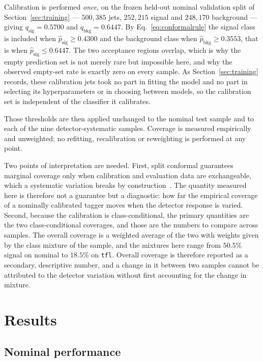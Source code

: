 \documentclass[pdflatex,sn-mathphys,Numbered,iicol]{sn-jnl}
\begin{document}
Calibration is performed \emph{once}, on the frozen held-out nominal validation split
of Section~\ref{sec:training} --- $500{,}385$ jets, $252{,}215$ signal and $248{,}170$
background --- giving $q_{\mathrm{sig}} = 0.5700$ and $q_{\mathrm{bkg}} = 0.6447$.
By Eq.~\ref{eq:conformalrule} the signal class is included when
$\hat p_{\mathrm{sig}} \ge 0.4300$ and the background class when
$\hat p_{\mathrm{bkg}} \ge 0.3553$, that is when
$\hat p_{\mathrm{sig}} \le 0.6447$. The two acceptance regions overlap, which is why
the empty prediction set is not merely rare but impossible here, and why the observed
empty-set rate is exactly zero on every sample. As Section~\ref{sec:training} records,
these calibration jets took no part in fitting the model and no part in selecting its
hyperparameters or in choosing between models, so the calibration set is independent of
the classifier it calibrates.

Those thresholds are then applied unchanged to the nominal test sample and to each of
the nine detector-systematic samples. Coverage is measured empirically and unweighted;
no refitting, recalibration or reweighting is performed at any point.

Two points of interpretation are needed. First, split conformal guarantees marginal
coverage only when calibration and evaluation data are exchangeable, which a systematic
variation breaks by construction~\cite{Tibshirani2019}. The quantity measured here is
therefore not a guarantee but a diagnostic: how far the empirical coverage of a
nominally calibrated tagger moves when the detector response is varied. Second, because
the calibration is class-conditional, the primary quantities are the two
class-conditional coverages, and those are the numbers to compare across samples. The
overall coverage is a weighted average of the two with weights given by the class
mixture of the sample, and the mixtures here range from $50.5\%$ signal on nominal to
$18.5\%$ on \texttt{tfl}. Overall coverage is therefore reported as a secondary,
descriptive number, and a change in it between two samples cannot be attributed to the
detector variation without first accounting for the change in mixture.

\section{Results}
\label{sec:results}

\subsection{Nominal performance}
\label{sec:nominal}
\end{document}
